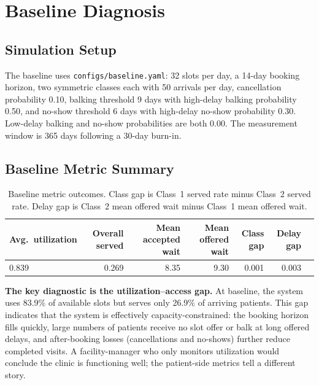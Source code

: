 \documentclass[11pt]{article}
\begin{document}
\section{Baseline Diagnosis}

\subsection{Simulation Setup}

The baseline uses \texttt{configs/baseline.yaml}: 32 slots per day, a 14-day
booking horizon, two symmetric classes each with 50 arrivals per day,
cancellation probability 0.10, balking threshold 9 days with high-delay
balking probability 0.50, and no-show threshold 6 days with high-delay
no-show probability 0.30. Low-delay balking and no-show probabilities are
both 0.00. The measurement window is 365 days following a 30-day burn-in.

\subsection{Baseline Metric Summary}

\begin{table}[H]
\centering
\renewcommand{\arraystretch}{1.15}
\begin{tabular}{lrrrrrr}
\toprule
Avg.\ utilization & Overall served & Mean accepted wait & Mean offered wait & Class gap & Delay gap \\
\midrule
0.839 & 0.269 & 8.35 & 9.30 & 0.001 & 0.003 \\
\bottomrule
\end{tabular}
\caption{Baseline metric outcomes. Class gap is Class~1 served rate
minus Class~2 served rate. Delay gap is Class~2 mean offered wait
minus Class~1 mean offered wait.}
\label{tab:baseline-outcomes}
\end{table}

\textbf{The key diagnostic is the utilization--access gap.} At baseline, the
system uses 83.9\% of available slots but serves only 26.9\% of arriving
patients. This gap indicates that the system is effectively capacity-constrained:
the booking horizon fills quickly, large numbers of patients receive no slot
offer or balk at long offered delays, and after-booking losses (cancellations
and no-shows) further reduce completed visits. A facility-manager who only
monitors utilization would conclude the clinic is functioning well; the
patient-side metrics tell a different story.
\end{document}
